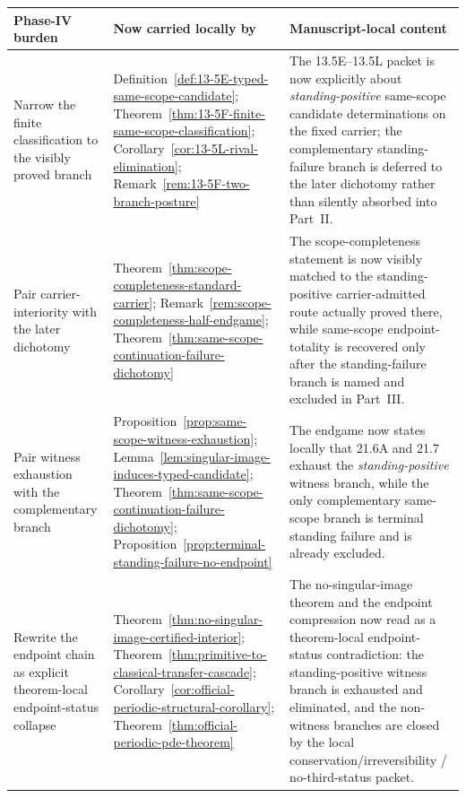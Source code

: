 \begin{center}
\footnotesize
\renewcommand{\arraystretch}{1.16}
\setlength{\tabcolsep}{4pt}
\begin{tabularx}{0.98\textwidth}{@{}L{0.31\textwidth}L{0.24\textwidth}Y@{}}
\toprule
\textbf{Phase-IV burden} & \textbf{Now carried locally by} & \textbf{Manuscript-local content}\\
\midrule
Narrow the finite classification to the visibly proved branch & Definition~\ref{def:13-5E-typed-same-scope-candidate}; Theorem~\ref{thm:13-5F-finite-same-scope-classification}; Corollary~\ref{cor:13-5L-rival-elimination}; Remark~\ref{rem:13-5F-two-branch-posture} & The 13.5E--13.5L packet is now explicitly about \emph{standing-positive} same-scope candidate determinations on the fixed carrier; the complementary standing-failure branch is deferred to the later dichotomy rather than silently absorbed into Part~II.\\
Pair carrier-interiority with the later dichotomy & Theorem~\ref{thm:scope-completeness-standard-carrier}; Remark~\ref{rem:scope-completeness-half-endgame}; Theorem~\ref{thm:same-scope-continuation-failure-dichotomy} & The scope-completeness statement is now visibly matched to the standing-positive carrier-admitted route actually proved there, while same-scope endpoint-totality is recovered only after the standing-failure branch is named and excluded in Part~III.\\
Pair witness exhaustion with the complementary branch & Proposition~\ref{prop:same-scope-witness-exhaustion}; Lemma~\ref{lem:singular-image-induces-typed-candidate}; Theorem~\ref{thm:same-scope-continuation-failure-dichotomy}; Proposition~\ref{prop:terminal-standing-failure-no-endpoint} & The endgame now states locally that 21.6A and 21.7 exhaust the \emph{standing-positive} witness branch, while the only complementary same-scope branch is terminal standing failure and is already excluded.\\
Rewrite the endpoint chain as explicit theorem-local endpoint-status collapse & Theorem~\ref{thm:no-singular-image-certified-interior}; Theorem~\ref{thm:primitive-to-classical-transfer-cascade}; Corollary~\ref{cor:official-periodic-structural-corollary}; Theorem~\ref{thm:official-periodic-pde-theorem} & The no-singular-image theorem and the endpoint compression now read as a theorem-local endpoint-status contradiction: the standing-positive witness branch is exhausted and eliminated, and the non-witness branches are closed by the local conservation/irreversibility / no-third-status packet.\\
\bottomrule
\end{tabularx}
\end{center}


